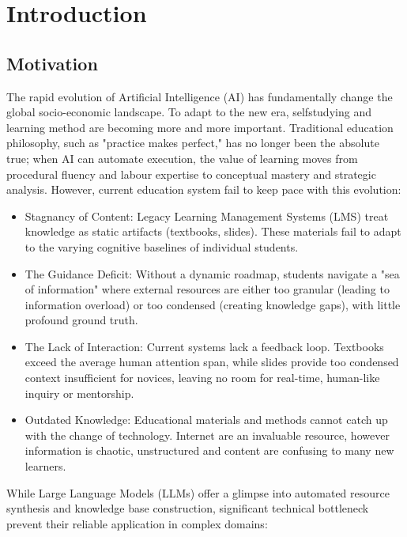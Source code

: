 \chapter{Introduction}

\section{Motivation}

The rapid evolution of Artificial Intelligence (AI) has fundamentally change the global socio-economic landscape. To adapt to the new era, self\-studying and learning method are becoming more and more important. Traditional education philosophy, such as "practice makes perfect," has no longer been the absolute true; when AI can automate execution, the value of learning moves from procedural fluency and labour expertise to conceptual mastery and strategic analysis. However, current education system fail to keep pace with this evolution:

\begin{itemize}
    \item {Stagnancy of Content:} Legacy Learning Management Systems (LMS) treat knowledge as static artifacts (textbooks, slides). These materials fail to adapt to the varying cognitive baselines of individual students.
    \item {The Guidance Deficit:} Without a dynamic roadmap, students navigate a "sea of information" where external resources are either too granular (leading to information overload) or too condensed (creating knowledge gaps), with little profound ground truth.
    \item {The Lack of Interaction:} Current systems lack a feedback loop. Textbooks exceed the average human attention span, while slides provide too condensed context insufficient for novices, leaving no room for real-time, human-like inquiry or mentorship.
    \item {Outdated Knowledge:} Educational materials and methods cannot catch up with the change of technology. Internet are an invaluable resource, however information is chaotic, unstructured and content are confusing to many new learners.
\end{itemize}

While Large Language Models (LLMs) offer a glimpse into automated resource synthesis and knowledge base construction, significant technical bottleneck prevent their reliable application in complex domains:

